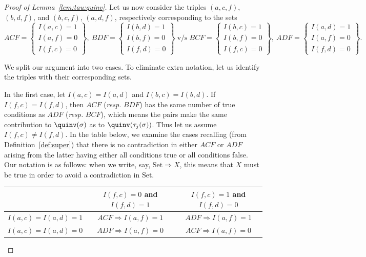 \begin{proof}[Proof of Lemma~\ref{lem:tau:quinv}]
Let us now consider the triples $(a,c,f)$, $(b,d,f)$, and $(b,c,f)$, $(a,d,f)$, respectively corresponding to the sets
{\scriptsize 
\[ 
ACF = \left\{\begin{matrix}I(a,c)=1\\I(a,f)=0\\I(f,c)=0 \end{matrix} \right\},\  
BDF = \left\{\begin{matrix}I(b,d)=1\\I(b,f)=0\\I(f,d)=0 \end{matrix} \right\} 
\; \mbox{v/s} \;
BCF = \left\{\begin{matrix}I(b,c)=1\\I(b,f)=0\\I(f,c)=0 \end{matrix} \right\},\ 
ADF = \left\{\begin{matrix}I(a,d)=1\\I(a,f)=0\\I(f,d)=0 \end{matrix} \right\}.
\]
}

We split our argument into two cases. To eliminate extra notation, let us identify the triples with their corresponding sets. 

In the first case, let $I(a,c)=I(a,d)$ and $I(b,c)=I(b,d)$. If $I(f,c)=I(f,d)$, then $ACF$ (\emph{resp.} $BDF$) has the same number of true conditions as $ADF$ (\emph{resp.} $BCF$), which means the pairs make the same contribution to $\quinv(\sigma)$ as to $\quinv(\tau_j(\sigma))$. Thus let us assume $I(f,c)\neq I(f,d)$. In the table below, we examine the cases recalling (from Definition~\ref{def:super}) that there is no contradiction in either $ACF$ or $ADF$ arising from the latter having either all conditions true or all conditions false. 
Our notation is as follows: when we write, say, $\text{Set} \Rightarrow X$, this means that $X$ must be true in order to avoid a contradiction in $\text{Set}$.


\begin{center}
{\renewcommand{\arraystretch}{1.2}
\flushleft
\footnotesize
\begin{tabular}{l|c|c|}
& $I(f,c)=0$ and $I(f,d)=1$ & $I(f,c)=1$ and $I(f,d)=0$\\ \hline
$I(a,c)=I(a,d)=1$ & $ACF \Rightarrow I(a,f)=1$ & $ADF \Rightarrow I(a,f)=1$ \\ \hline
$I(a,c)=I(a,d)=0$ & $ADF \Rightarrow I(a,f)=0$ & $ACF \Rightarrow I(a,f)=0$\\ \hline


\end{tabular}}
\end{center}
\end{proof}
